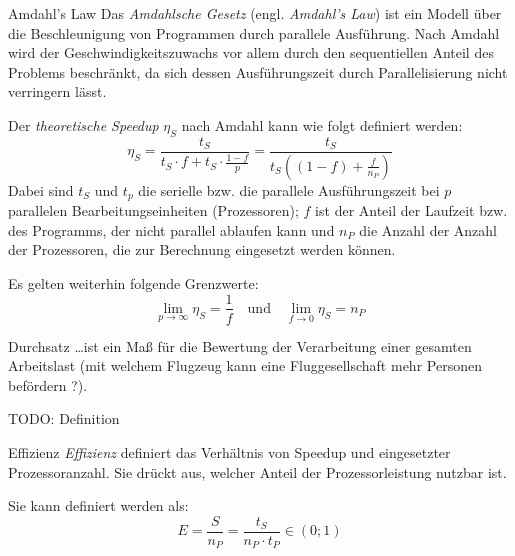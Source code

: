 \begin{defi}{Amdahl's Law}
    Das \emph{Amdahlsche Gesetz} (engl. \emph{Amdahl's Law}) ist ein Modell über die Beschleunigung von Programmen durch parallele Ausführung.
    Nach Amdahl wird der Geschwindigkeitszuwachs vor allem durch den sequentiellen Anteil des Problems beschränkt, da sich dessen Ausführungszeit durch Parallelisierung nicht verringern lässt.

    Der \emph{theoretische Speedup} $\eta_S$ nach Amdahl kann wie folgt definiert werden:
    \[
        \eta_S = \frac{t_S}{t_S \cdot f + t_S \cdot \frac{1-f}{p} } = \frac{t_S}{t_S \left((1 - f) + \frac{f}{n_P}\right)}
    \]
    Dabei sind $t_S$ und $t_p$ die serielle bzw. die parallele Ausführungszeit bei $p$ parallelen Bearbeitungseinheiten (Prozessoren);
    $f$ ist der Anteil der Laufzeit bzw. des Programms, der nicht parallel ablaufen kann und $n_P$ die Anzahl der Anzahl der Prozessoren, die zur Berechnung eingesetzt werden können.

    Es gelten weiterhin folgende Grenzwerte:
    \[
        \lim_{p \to \infty} \eta_S = \frac{1}{f} \quad \text{und} \quad \lim_{f \to 0 } \eta_S = n_P
    \]
\end{defi}

\begin{bonus}{Durchsatz}
    \ldots ist ein Maß für die Bewertung der Verarbeitung einer gesamten Arbeitslast
    (mit welchem Flugzeug kann eine Fluggesellschaft mehr Personen befördern ?).

    TODO: Definition
\end{bonus}

\begin{defi}{Effizienz}
    \emph{Effizienz} definiert das Verhältnis von Speedup und eingesetzter Prozessoranzahl.
    Sie drückt aus, welcher Anteil der Prozessorleistung nutzbar ist.

    Sie kann definiert werden als:
    \[
        E = \frac{S}{n_P} = \frac{t_S}{n_P\cdot t_P} \in (0; 1)
    \]
\end{defi}

